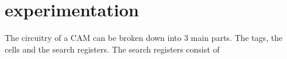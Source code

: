 \section{experimentation}
The circuitry of a CAM can be broken down into 3 main parts. The tags, the cells and the search registers. 
The search registers consist of 